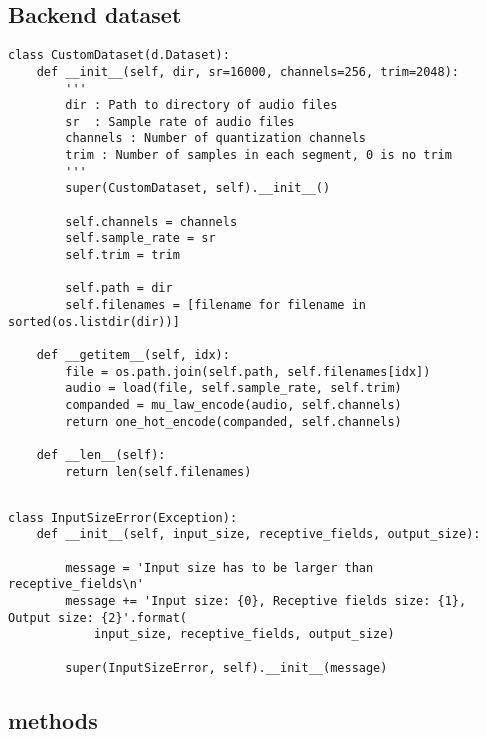 \subsection{Backend dataset}
\begin{verbatim}
class CustomDataset(d.Dataset):
    def __init__(self, dir, sr=16000, channels=256, trim=2048):
        '''
        dir : Path to directory of audio files
        sr  : Sample rate of audio files
        channels : Number of quantization channels
        trim : Number of samples in each segment, 0 is no trim
        '''
        super(CustomDataset, self).__init__()

        self.channels = channels
        self.sample_rate = sr
        self.trim = trim

        self.path = dir
        self.filenames = [filename for filename in sorted(os.listdir(dir))]

    def __getitem__(self, idx):
        file = os.path.join(self.path, self.filenames[idx])
        audio = load(file, self.sample_rate, self.trim)
        companded = mu_law_encode(audio, self.channels)
        return one_hot_encode(companded, self.channels)

    def __len__(self):
        return len(self.filenames)
\end{verbatim}

\subsection{}


\begin{verbatim}
class InputSizeError(Exception):
    def __init__(self, input_size, receptive_fields, output_size):

        message = 'Input size has to be larger than receptive_fields\n'
        message += 'Input size: {0}, Receptive fields size: {1}, Output size: {2}'.format(
            input_size, receptive_fields, output_size)

        super(InputSizeError, self).__init__(message)

\end{verbatim}

\newpage
\subsection{ methods}

